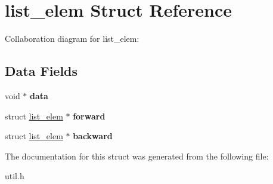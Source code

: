 \hypertarget{structlist__elem}{}\section{list\+\_\+elem Struct Reference}
\label{structlist__elem}


Collaboration diagram for list\+\_\+elem\+:
\subsection*{Data Fields}
\begin{DoxyCompactItemize}
\item 
void $\ast$ {\bfseries data}\hypertarget{structlist__elem_a74a8f8f17e3cae5a587f291f7ca83fce}{}\label{structlist__elem_a74a8f8f17e3cae5a587f291f7ca83fce}

\item 
struct \hyperlink{structlist__elem}{list\+\_\+elem} $\ast$ {\bfseries forward}\hypertarget{structlist__elem_a2bc0b66c48bfc499a943ff73eccc8d3f}{}\label{structlist__elem_a2bc0b66c48bfc499a943ff73eccc8d3f}

\item 
struct \hyperlink{structlist__elem}{list\+\_\+elem} $\ast$ {\bfseries backward}\hypertarget{structlist__elem_af0d432cb615ae4bdc238f99ba4b88036}{}\label{structlist__elem_af0d432cb615ae4bdc238f99ba4b88036}

\end{DoxyCompactItemize}


The documentation for this struct was generated from the following file\+:\begin{DoxyCompactItemize}
\item 
util.\+h\end{DoxyCompactItemize}
